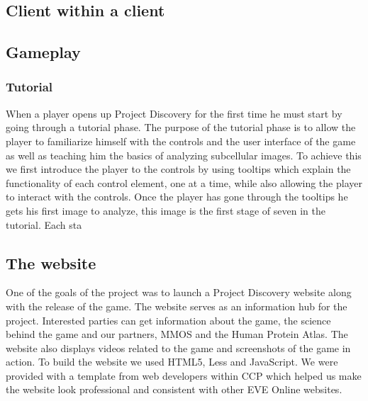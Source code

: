 \subsection{Client within a client}

\subsection{Gameplay}

	\subsubsection{Tutorial}
		When a player opens up Project Discovery for the first time he must start by going through a tutorial phase. The purpose of the tutorial phase is to allow the player to familiarize himself with the controls and the user interface of the game as well as teaching him the basics of analyzing subcellular images. To achieve this we first introduce the player to the controls by using tooltips which explain the functionality of each control element, one at a time, while also allowing the player to interact with the controls. Once the player has gone through the tooltips he gets his first image to analyze, this image is the first stage of seven in the tutorial. Each sta

\subsection{The website}
	One of the goals of the project was to launch a Project Discovery website along with the release of the game. The website serves as an information hub for the project. Interested parties can get information about the game, the science behind the game and our partners, MMOS and the Human Protein Atlas. The website also displays videos related to the game and screenshots of the game in action. To build the website we used HTML5, Less and JavaScript. We were provided with a template from web developers within CCP which helped us make the website look professional and consistent with other EVE Online websites.

